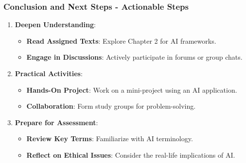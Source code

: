 \documentclass[aspectratio=169]{beamer}
\begin{document}
\begin{frame}[fragile]
    \frametitle{Conclusion and Next Steps - Actionable Steps}
    \begin{enumerate}
        \item \textbf{Deepen Understanding}:
        \begin{itemize}
            \item \textbf{Read Assigned Texts}: Explore Chapter 2 for AI frameworks.
            \item \textbf{Engage in Discussions}: Actively participate in forums or group chats.
        \end{itemize}
        
        \item \textbf{Practical Activities}:
        \begin{itemize}
            \item \textbf{Hands-On Project}: Work on a mini-project using an AI application.
            \item \textbf{Collaboration}: Form study groups for problem-solving.
        \end{itemize}
        
        \item \textbf{Prepare for Assessment}:
        \begin{itemize}
            \item \textbf{Review Key Terms}: Familiarize with AI terminology.
            \item \textbf{Reflect on Ethical Issues}: Consider the real-life implications of AI.
        \end{itemize}
    \end{enumerate}
\end{frame}
\end{document}
